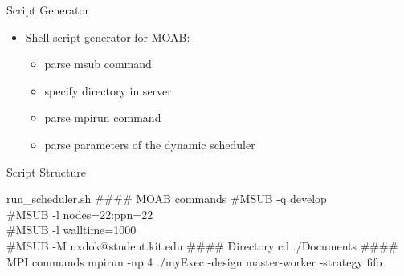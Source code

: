         
    		
	
	\begin{frame}{Script Generator}
	\begin{itemize}
		\pause
		\item Shell script generator for MOAB:
		
		\begin{itemize}
			\pause
			\item parse msub command
			
			\pause			
			\item specify directory in server %
			 
			\pause
			\item parse mpirun command
			
			\pause
			\item parse parameters of the dynamic scheduler
		\end{itemize}
			\end{itemize}
	\end{frame}
	
	
	
	\begin{frame}{Script Structure}
		
		\begin{block}{run\_scheduler.sh}
		        \#\#\#\# MOAB commands
		        \newline
		        \newline
				\#MSUB  -q develop\\
				\#MSUB  -l nodes=22:ppn=22\\
				\#MSUB  -l walltime=1000\\
				\#MSUB  -M uxdok@student.kit.edu
				\newline
				\newline
        				\#\#\#\# Directory
				\newline
				\newline
				cd ./Documents
				\newline
				\newline
        				\#\#\#\# MPI commands
        			\newline
        			\newline
				mpirun -np 4 ./myExec -design master-worker -strategy fifo
			
		\end{block}
	\end{frame}
	
	